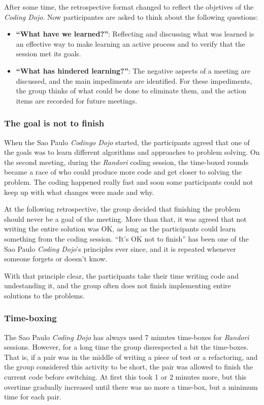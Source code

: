 After some time, the retrospective format changed to reflect the
objetives of the \emph{Coding Dojo}. Now participantes are asked to
think about the following questions:

\begin{itemize}
\item \textbf{``What have we learned?''}: Reflecting and discussing
  what was learned is an effective way to make learning an active
  process and to verify that the session met its goals.
\item \textbf{``What has hindered learning?''}: The negative aspects
  of a meeting are discussed, and the main impediments are
  identified. For these impediments, the group thinks of what could be
  done to eliminate them, and the action items are recorded for future
  meetings.
\end{itemize}

\subsubsection{The goal is not to finish}

When the Sao Paulo \emph{Codingo Dojo} started, the participants
agreed that one of the goals was to learn different algorithms and
approaches to problem solving. On the second meeting, during the
\textsl{Randori} coding session, the time-boxed rounds became a race
of who could produce more code and get closer to solving the
problem. The coding happened really fast and soon some participants
could not keep up with what changes were made and why.

At the following retrospective, the group decided that finishing the
problem should never be a goal of the meeting. More than that, it was
agreed that not writing the entire solution was OK, as long as the
participants could learn something from the coding session. ``It's OK
not to finish'' has been one of the Sao Paulo \emph{Coding Dojo}'s
principles ever since, and it is repeated whenever someone forgets or
doesn't know.

With that principle clear, the participants take their time writing
code and undestanding it, and the group often does not finish
implementing entire solutions to the problems.

\subsubsection{Time-boxing}

The Sao Paulo \emph{Coding Dojo} has always used 7 minutes time-boxes
for \textsl{Randori} sessions. However, for a long time the group
disrespected a bit the time-boxes. That is, if a pair was in the
middle of writing a piece of test or a refactoring, and the group
considered this activity to be short, the pair was allowed to finish
the current code before switching. At first this took 1 or 2 minutes
more, but this overtime gradually increased until there was no more a
time-box, but a minimum time for each pair.

